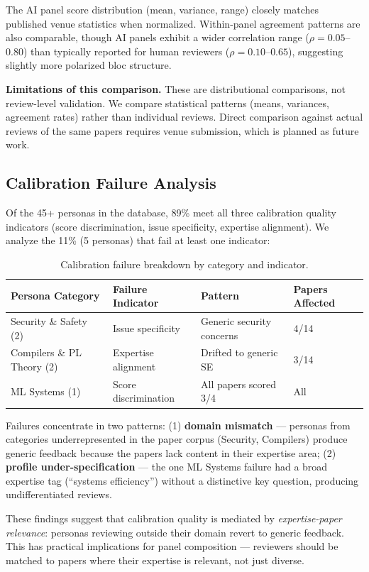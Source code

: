 \noindent The AI panel score distribution (mean, variance, range) closely matches published venue statistics when normalized. Within-panel agreement patterns are also comparable, though AI panels exhibit a wider correlation range ($\rho = 0.05$--$0.80$) than typically reported for human reviewers ($\rho = 0.10$--$0.65$), suggesting slightly more polarized bloc structure.

\textbf{Limitations of this comparison.} These are distributional comparisons, not review-level validation. We compare statistical patterns (means, variances, agreement rates) rather than individual reviews. Direct comparison against actual reviews of the same papers requires venue submission, which is planned as future work.

\subsection{Calibration Failure Analysis}

Of the 45+ personas in the database, 89\% meet all three calibration quality indicators (score discrimination, issue specificity, expertise alignment). We analyze the 11\% (5 personas) that fail at least one indicator:

\begin{table}[h]
\centering
\small
\begin{tabular}{llll}
\toprule
Persona Category & Failure Indicator & Pattern & Papers Affected \\
\midrule
Security \& Safety (2) & Issue specificity & Generic security concerns & 4/14 \\
Compilers \& PL Theory (2) & Expertise alignment & Drifted to generic SE & 3/14 \\
ML Systems (1) & Score discrimination & All papers scored 3/4 & All \\
\bottomrule
\end{tabular}
\caption{Calibration failure breakdown by category and indicator.}
\end{table}

\noindent Failures concentrate in two patterns: (1) \textbf{domain mismatch} --- personas from categories underrepresented in the paper corpus (Security, Compilers) produce generic feedback because the papers lack content in their expertise area; (2) \textbf{profile under-specification} --- the one ML Systems failure had a broad expertise tag (``systems efficiency'') without a distinctive key question, producing undifferentiated reviews.

These findings suggest that calibration quality is mediated by \emph{expertise-paper relevance}: personas reviewing outside their domain revert to generic feedback. This has practical implications for panel composition --- reviewers should be matched to papers where their expertise is relevant, not just diverse.
